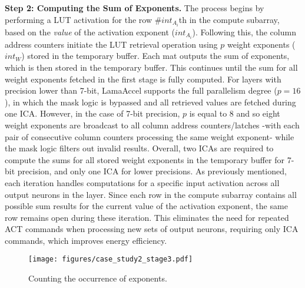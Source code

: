 \textbf{Step 2: Computing the Sum of Exponents.} The process begins by performing a LUT activation for the row $\#int_{A_{i}}$th in the compute subarray, based on the \textit{value} of the activation exponent ($int_{A_{i}}$). Following this, the column address counters initiate the LUT retrieval operation using $p$ weight exponents ($int_{W}$) stored in the temporary buffer. Each mat outputs the sum of exponents, which is then stored in the temporary buffer. This continues until the sum for all weight exponents fetched in the first stage is fully computed. For layers with precision lower than 7-bit, LamaAccel supports the full parallelism degree ($p=16$), in which the mask logic is bypassed and all retrieved values are fetched during one ICA. However, in the case of 7-bit precision, $p$ is equal to 8 and so eight weight exponents are broadcast to all column address counters/latches -with each pair of consecutive column counters processing the same weight exponent- while the mask logic filters out invalid results. Overall, two ICAs are required to compute the sums for all stored weight exponents in the temporary buffer for 7-bit precision, and only one ICA for lower precisions. As previously mentioned, each iteration handles computations for a specific input activation across all output neurons in the layer. Since each row in the compute subarray contains all possible sum results for the current value of the activation exponent, the same row remains open during these iteration. This eliminates the need for repeated ACT commands when processing new sets of output neurons, requiring only ICA commands, which improves energy efficiency.

\begin{figure*}[t!]
\centering
\texttt{[image: figures/case\_study2\_stage3.pdf]}
\caption{Counting the occurrence of exponents.}
\label{fig:step3}
\vskip -0.15in
\end{figure*}

